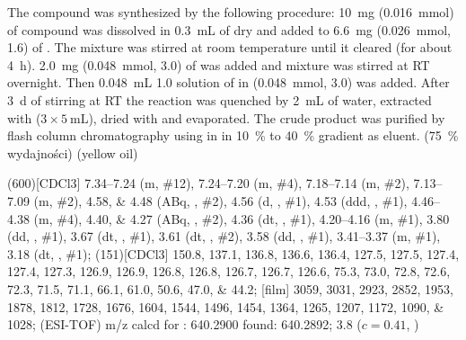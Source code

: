 The compound was synthesized by the following procedure:
\SI{10}{\milli\gram} (\SI{0.016}{\milli\mol}) of compound  was dissolved in \SI{0.3}{\milli\liter} of dry  and added to \SI{6.6}{\milli\gram} (\SI{0.026}{\milli\mol}, \SI{1.6}{\equiv}) of .
The mixture was stirred at room temperature until it cleared (for about \SI{4}{\hour}).
\SI{2.0}{\milli\gram} (\SI{0.048}{\milli\mol}, \SI{3.0}{\equiv}) of  was added and mixture was stirred at RT overnight.
Then \SI{0.048}{\milli\liter} \SI{1.0}{\Molar} solution of  in  (\SI{0.048}{\milli\mol}, \SI{3.0}{\equiv}) was added.
After \SI{3}{\day} of stirring at RT the reaction was quenched by \SI{2}{\milli\liter} of water, extracted with  ($3 \times \SI{5}{\milli\liter}$), dried with  and evaporated.
The crude product was purified by flash column chromatography using  in  in \SI{10}{\percent} to \SI{40}{\percent} gradient as eluent.
(\SI{75}{\percent} wydajności) (yellow oil)

\begin{fullexp}
	\NMR(600)[CDCl3] \numrange{7.34}{7.24} (m, \#{12}), \numrange{7.24}{7.20} (m, \#{4}), \numrange{7.18}{7.14} (m, \#{2}), \numrange{7.13}{7.09} (m, \#{2}), \numlist{4.58;4.48} (ABq, , \#{2}), \num{4.56} (d, , \#{1}), \num{4.53} (ddd, , \#{1}), \numrange{4.46}{4.38} (m, \#{4}), \numlist{4.40;4.27} (ABq, , \#{2}), \num{4.36} (dt, , \#{1}), \numrange{4.20}{4.16} (m, \#{1}), \num{3.80} (dd, , \#{1}), \num{3.67} (dt, , \#{1}), \num{3.61} (dt, , \#{2}), \num{3.58} (dd, , \#{1}), \numrange{3.41}{3.37} (m, \#{1}), \num{3.18} (dt, , \#{1});
	(151)[CDCl3] \numlist{150.8; 137.1; 136.8; 136.6; 136.4; 127.5; 127.5; 127.4; 127.4; 127.3; 126.9; 126.9; 126.8; 126.8; 126.7; 126.7; 126.6; 75.3; 73.0; 72.8; 72.6; 72.3; 71.5; 71.1; 66.1; 61.0; 50.6; 47.0; 44.2};
	[film] \numlist{3059; 3031; 2923; 2852; 1953; 1878; 1812; 1728; 1676; 1604; 1544; 1496; 1454; 1364; 1265; 1207; 1172; 1090; 1028};
	 (ESI-TOF) m/z calcd for : \num{640.2900} found: \num{640.2892};
	\data{[$\alpha^{23}_D$]~$=$} \num{3.8} ($c = 0.41$, )
\end{fullexp}

